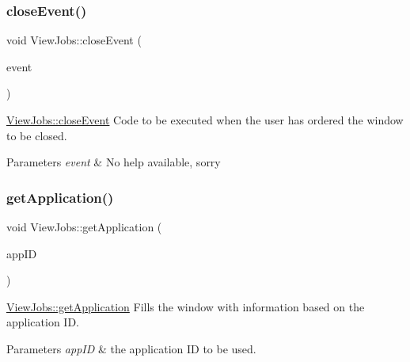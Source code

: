 \subsubsection{\texorpdfstring{close\+Event()}{closeEvent()}}
{\footnotesize\ttfamily void View\+Jobs\+::close\+Event (\begin{DoxyParamCaption}\item[{Q\+Close\+Event $\ast$}]{event }\end{DoxyParamCaption})\hspace{0.3cm}{\ttfamily [override]}}



\mbox{\hyperlink{class_view_jobs_a832503ca9eb4e4bf79c2fb48a59141aa}{View\+Jobs\+::close\+Event}} Code to be executed when the user has ordered the window to be closed. 


\begin{DoxyParams}{Parameters}
{\em event} & No help available, sorry \\
\hline
\end{DoxyParams}
\mbox{\label{class_view_jobs_ae9c1c806aa1dd5082b38a1dc9cbec39e}} 
\subsubsection{\texorpdfstring{get\+Application()}{getApplication()}}
{\footnotesize\ttfamily void View\+Jobs\+::get\+Application (\begin{DoxyParamCaption}\item[{int}]{app\+ID }\end{DoxyParamCaption})}



\mbox{\hyperlink{class_view_jobs_ae9c1c806aa1dd5082b38a1dc9cbec39e}{View\+Jobs\+::get\+Application}} Fills the window with information based on the application ID. 


\begin{DoxyParams}{Parameters}
{\em app\+ID} & the application ID to be used. \\
\hline
\end{DoxyParams}
\mbox{\label{class_view_jobs_a086650882ad80acb4074cf697f8cddcb}} 
